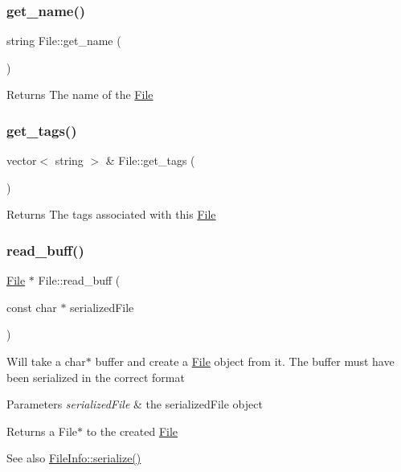 \subsubsection{\texorpdfstring{get\+\_\+name()}{get\_name()}}
{\footnotesize\ttfamily string File\+::get\+\_\+name (\begin{DoxyParamCaption}{ }\end{DoxyParamCaption})}

\begin{DoxyReturn}{Returns}
The name of the \mbox{\hyperlink{class_file}{File}} 
\end{DoxyReturn}
\mbox{\label{class_file_a479270bfe1fa436d317151ac108eb28a}} 
\subsubsection{\texorpdfstring{get\+\_\+tags()}{get\_tags()}}
{\footnotesize\ttfamily vector$<$ string $>$ \& File\+::get\+\_\+tags (\begin{DoxyParamCaption}{ }\end{DoxyParamCaption})}

\begin{DoxyReturn}{Returns}
The tags associated with this \mbox{\hyperlink{class_file}{File}} 
\end{DoxyReturn}
\mbox{\label{class_file_a1118d477e6b00d789e948e8cca5ae393}} 
\subsubsection{\texorpdfstring{read\+\_\+buff()}{read\_buff()}}
{\footnotesize\ttfamily \mbox{\hyperlink{class_file}{File}} $\ast$ File\+::read\+\_\+buff (\begin{DoxyParamCaption}\item[{const char $\ast$}]{serialized\+File }\end{DoxyParamCaption})\hspace{0.3cm}{\ttfamily [static]}}

Will take a char$\ast$ buffer and create a \mbox{\hyperlink{class_file}{File}} object from it. The buffer must have been serialized in the correct format 
\begin{DoxyParams}{Parameters}
{\em serialized\+File} & the serialized\+File object \\
\hline
\end{DoxyParams}
\begin{DoxyReturn}{Returns}
a File$\ast$ to the created \mbox{\hyperlink{class_file}{File}} 
\end{DoxyReturn}
\begin{DoxySeeAlso}{See also}
\mbox{\hyperlink{class_file_info_a64fc62c3e376dfd61088932d8b793589}{File\+Info\+::serialize()}} 
\end{DoxySeeAlso}


